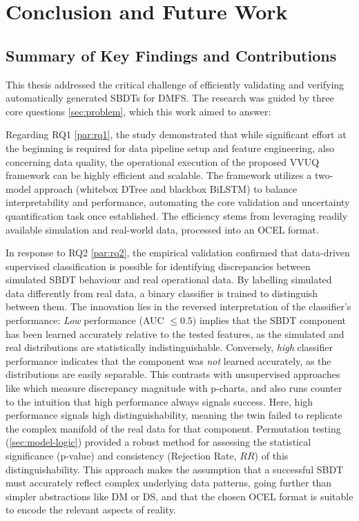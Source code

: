 \chapter{Conclusion and Future Work}
\label{chap:conclusion}

\section{Summary of Key Findings and Contributions}
\label{sec:conclusion_summary_findings}

This thesis addressed the critical challenge of efficiently validating and verifying automatically generated SBDTs for DMFS. The research was guided by three core questions \autoref{sec:problem}, which this work aimed to answer:

Regarding RQ1 \autoref{par:rq1}, the study demonstrated that while significant effort at the beginning is required for data pipeline setup and feature engineering, also concerning data quality, the operational execution of the proposed VVUQ framework can be highly efficient and scalable. The framework utilizes a two-model approach (whitebox DTree and blackbox BiLSTM) to balance interpretability and performance, automating the core validation and uncertainty quantification task once established. The efficiency stems from leveraging readily available simulation and real-world data, processed into an OCEL format.

In response to RQ2 \autoref{par:rq2}, the empirical validation confirmed that data-driven supervised classification is possible for identifying discrepancies between simulated SBDT behaviour and real operational data. By labelling simulated data differently from real data, a binary classifier is trained to distinguish between them. The innovation lies in the reversed interpretation of the classifier's performance: \textit{Low} performance (AUC $\le 0.5$) implies that the SBDT component has been learned accurately relative to the tested features, as the simulated and real distributions are statistically indistinguishable. Conversely, \textit{high} classifier performance indicates that the component was \textit{not} learned accurately, as the distributions are easily separable. This contrasts with unsupervised approaches like \textcite{dos2024digital} which measure discrepancy magnitude with p-charts, and also runs counter to the intuition that high performance always signals success. Here, high performance signals high distinguishability, meaning the twin failed to replicate the complex manifold of the real data for that component. Permutation testing (\autoref{sec:model-logic}) provided a robust method for assessing the statistical significance (p-value) and consistency (Rejection Rate, $RR$) of this distinguishability. This approach makes the assumption that a successful SBDT must accurately reflect complex underlying data patterns, going further than simpler abstractions like DM or DS, and that the chosen OCEL format is suitable to encode the relevant aspects of reality.

